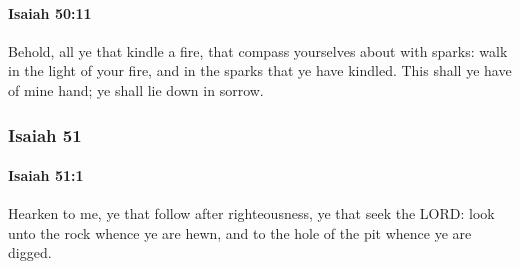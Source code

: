		\paragraph{Isaiah 50:11} %
			\label{ISAIAH-50-11}

			Behold, all ye that kindle a fire, that compass yourselves about with sparks: walk in the light of your fire, and in the sparks that ye have kindled. This shall ye have of mine hand; ye shall lie down in sorrow.

	\subsubsection{Isaiah 51} %
		\label{ISAIAH-51}

		\paragraph{Isaiah 51:1} %
			\label{ISAIAH-51-1}

			Hearken to me, ye that follow after righteousness, ye that seek the LORD: look unto the rock whence ye are hewn, and to the hole of the pit whence ye are digged.

